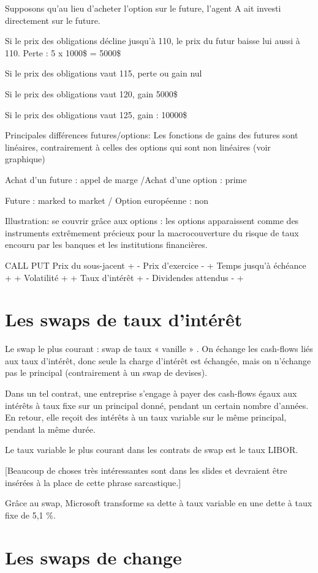 Supposons qu'au lieu d'acheter l'option sur le future, l'agent A ait investi 
directement sur le future. 

Si le prix des obligations décline jusqu'à 110, le prix du futur baisse lui 
aussi à 110. Perte : 5 x 1000\$ = 5000\$ 

Si le prix des obligations vaut 115, perte ou gain nul 

Si le prix des obligations vaut 120, gain 5000\$ 

Si le prix des obligations vaut 125, gain : 10000\$

Principales différences futures/options: 
Les fonctions de gains des futures sont linéaires, contrairement à celles des 
options qui sont non linéaires (voir graphique) 

Achat d'un future : appel de marge /Achat d'une option : prime 

Future : marked to market / Option européenne : non

Illustration: se couvrir grâce aux options : les options apparaissent comme des instruments extrêmement précieux pour la macrocouverture du risque de taux encouru par les banques et les institutions financières.

CALL  PUT 
Prix du sous-jacent  +  - 
Prix d'exercice  -  + 
Temps jusqu'à échéance  +   +  
Volatilité  +  + 
Taux d'intérêt  +   - 
Dividendes attendus  -  + 

\section{Les swaps de taux d'intérêt}

Le swap le plus courant : swap de taux « vanille » . On échange les cash-flows liés aux taux d'intérêt, donc seule la charge d'intérêt est échangée, mais on n'échange pas le principal (contrairement à un swap de devises).

Dans un tel contrat, une entreprise s'engage à payer des cash-flows égaux aux intérêts à taux fixe sur un principal donné, pendant un certain nombre d'années. En retour, elle reçoit des intérêts à un taux variable sur le même principal, pendant la même durée. 

Le taux variable le plus courant dans les contrats de swap est le taux LIBOR. 

[Beaucoup de choses très intéressantes sont dans les slides et devraient être insérées à la place de cette phrase sarcastique.]

Grâce au swap, Microsoft transforme sa dette à taux variable en une dette à taux fixe de 5,1 \%.

\section{Les swaps de change}